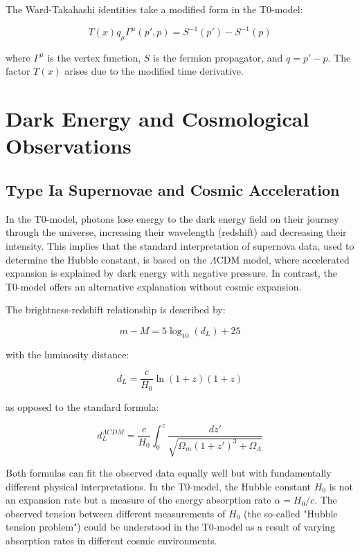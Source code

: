 \documentclass[a4paper,12pt]{article}
\theoremstyle{definition}
\theoremstyle{remark}
\newcommand{\Tfield}{T(x)} %
\begin{document}
	The Ward-Takahashi identities take a modified form in the T0-model:
	
	\begin{equation}
		\Tfield q_\mu \Gamma^\mu(p',p) = S^{-1}(p') - S^{-1}(p)
	\end{equation}
	
	where \(\Gamma^\mu\) is the vertex function, \(S\) is the fermion propagator, and \(q = p' - p\). The factor \(\Tfield\) arises due to the modified time derivative.
	
	\section{Dark Energy and Cosmological Observations}
	
	\subsection{Type Ia Supernovae and Cosmic Acceleration}
	
	In the T0-model, photons lose energy to the dark energy field on their journey through the universe, increasing their wavelength (redshift) and decreasing their intensity. This implies that the standard interpretation of supernova data, used to determine the Hubble constant, is based on the \(\Lambda\)CDM model, where accelerated expansion is explained by dark energy with negative pressure. In contrast, the T0-model offers an alternative explanation without cosmic expansion.
	
	The brightness-redshift relationship is described by:
	
	\begin{equation}
		m - M = 5 \log_{10}(d_L) + 25
	\end{equation}
	
	with the luminosity distance:
	
	\begin{equation}
		d_L = \frac{c}{H_0} \ln(1+z) (1+z)
	\end{equation}
	
	as opposed to the standard formula:
	
	\begin{equation}
		d_L^{\Lambda CDM} = \frac{c}{H_0} \int_0^z \frac{dz'}{\sqrt{\Omega_m(1+z')^3 + \Omega_{\Lambda}}}
	\end{equation}
	
	Both formulas can fit the observed data equally well but with fundamentally different physical interpretations. In the T0-model, the Hubble constant \(H_0\) is not an expansion rate but a measure of the energy absorption rate \(\alpha = H_0/c\). The observed tension between different measurements of \(H_0\) (the so-called "Hubble tension problem") could be understood in the T0-model as a result of varying absorption rates in different cosmic environments.
	
\end{document}

